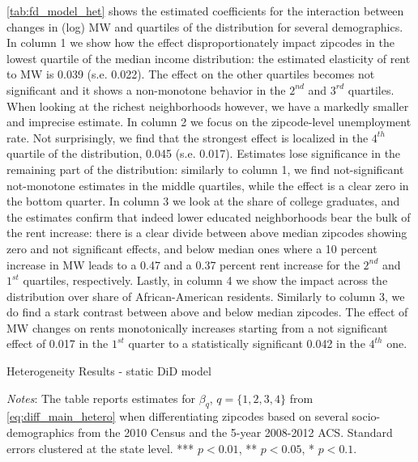 \autoref{tab:fd_model_het} shows the estimated coefficients for the interaction between changes in 
(log) MW and quartiles of the distribution for several demographics. In column 1 we show how the 
effect disproportionately impact zipcodes in the lowest quartile of the median income distribution: 
the estimated elasticity of rent to MW is 0.039 (s.e. 0.022). The effect on the other quartiles 
becomes not significant and it shows a non-monotone behavior in the $2^{nd}$ and $3^{rd}$ quartiles. 
When looking at the richest neighborhoods however, we have a markedly smaller and imprecise estimate. 
In column 2 we focus on the zipcode-level unemployment  rate. Not surprisingly, we find that the 
strongest effect is localized in the $4^{th}$ quartile of the distribution, 0.045 (s.e. 0.017). 
Estimates lose significance in the remaining part of the distribution: similarly to column 1, we 
find not-significant not-monotone estimates in the middle quartiles, while the effect is a clear 
zero in the bottom quarter. In column 3 we look at the share of college graduates, and the estimates 
confirm that indeed lower educated neighborhoods bear the bulk of the rent increase: there is a 
clear divide between above median zipcodes showing zero and not significant effects, and below 
median ones where a 10 percent increase in MW leads to a 0.47 and a 0.37 percent rent increase for 
the $2^{nd}$ and $1^{st}$ quartiles, respectively. Lastly, in column 4 we show the impact across 
the distribution over share of African-American residents. Similarly to column 3, we do find a 
stark contrast between above and below median zipcodes. The effect of MW changes on rents 
monotonically increases starting from a not significant effect of 0.017 in the $1^{st}$ quarter to 
a statistically significant 0.042 in the $4^{th}$ one.

\begin{table}[h!]
    \caption{Heterogeneity Results - static DiD model}
    \label{tab:fd_model_het}
    \centering
    \resizebox{0.9\textwidth}{!}{             %
	    \vspace{0pt}    
	    
    }
    \begin{minipage}{0.95\textwidth} \footnotesize
		\vspace{3mm}
		\textit{Notes}: The table reports estimates for $\beta_{q}$, $q=\{1, 2, 3, 4\}$ from 
		\autoref{eq:diff_main_hetero} when differentiating zipcodes based on several 
		socio-demographics from the 2010 Census and the 5-year 2008-2012 ACS. Standard errors 
		clustered at the state level. *** $p < 0.01$, ** $p < 0.05$, * $p < 0.1$.  
	\end{minipage}
\end{table}
